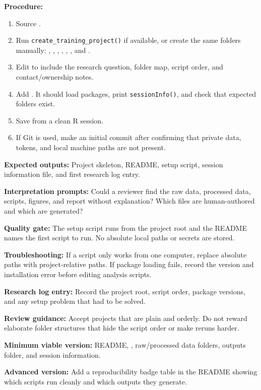 \textbf{Procedure:}
\begin{enumerate}
  \item Source .
  \item Run \texttt{create\_training\_project()} if available, or create the same folders manually: , , , , , , and .
  \item Edit  to include the research question, folder map, script order, and contact/ownership notes.
  \item Add . It should load packages, print \texttt{sessionInfo()}, and check that expected folders exist.
  \item Save  from a clean R session.
  \item If Git is used, make an initial commit after confirming that private data, tokens, and local machine paths are not present.
\end{enumerate}

\textbf{Expected outputs:} Project skeleton, README, setup script, session information file, and first research log entry.

\textbf{Interpretation prompts:} Could a reviewer find the raw data, processed data, scripts, figures, and report without explanation? Which files are human-authored and which are generated?

\textbf{Quality gate:} The setup script runs from the project root and the README names the first script to run. No absolute local paths or secrets are stored.

\textbf{Troubleshooting:} If a script only works from one computer, replace absolute paths with project-relative paths. If package loading fails, record the version and installation error before editing analysis scripts.

\textbf{Research log entry:} Record the project root, script order, package versions, and any setup problem that had to be solved.

\textbf{Review guidance:} Accept projects that are plain and orderly. Do not reward elaborate folder structures that hide the script order or make reruns harder.

\textbf{Minimum viable version:} README, , raw/processed data folders, outputs folder, and session information.

\textbf{Advanced version:} Add a reproducibility badge table in the README showing which scripts run cleanly and which outputs they generate.

